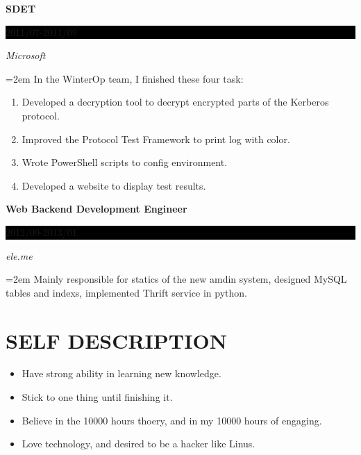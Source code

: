 \documentclass[paper=a4,fontsize=11pt]{scrartcl}	 			%
\newcommand{\sepspace}{\vspace*{1em}}			%
\newcommand{\NewPart}[1]{\section*{\uppercase{#1}}}
\newcommand{\EducationEntry}[4]{
		\noindent \textbf{#1} \hfill 					%
		\colorbox{Black}{%
			\parbox{8em}{%
			\hfill\color{White}#2}} \par				%
		\noindent \textit{#3} \par					%
		\noindent\hangindent=2em\hangafter=0  #4 	%
		\normalsize \par}
\begin{document}
\EducationEntry{SDET}{2011/07-2011/09}{Microsoft}
{In the WinterOp team, I finished these four task:
\begin{enumerate}
        \item Developed a decryption tool to decrypt encrypted parts of the Kerberos protocol.
        \item Improved the Protocol Test Framework to print log with color. 
        \item Wrote PowerShell scripts to config environment.
        \item Developed a website to display test results.
\end{enumerate}
}
\sepspace

\EducationEntry{Web Backend Development Engineer}{2012/09-2013/01}{ele.me}
{Mainly responsible for statics of the new amdin system,
designed MySQL tables and indexs, implemented Thrift service in python.
}

\NewPart{Self Description}{}
\begin{itemize}
\item Have strong ability in learning new knowledge.
\item Stick to one thing until finishing it.
\item Believe in the 10000 hours thoery, and in my 10000 hours of engaging.
\item Love technology, and desired to be a hacker like Linus.
\end{itemize}
\end{document}
